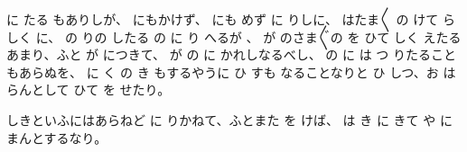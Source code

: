 に
たる
もありしが、
にもかけず、
にも
めず
に
りしに、
はたま〳〵
の
けて
らしく
に、
の
りの
したる
の
に
り
へるが
、
が
のさま〴〵の
を
ひて
しく
えたるあまり、ふと
が
につきて、
が
の
に
かれしなるべし、
の
に
は
つ
りたることもあらぬを、
に
く
の
き
もするやうに
ひ
すも
なることなりと
ひ
しつ、お
は
らんとして
ひて
を
せたり。

しきといふにはあらねど
に
りかねて、ふとまた
を
けば、
は
き
に
きて
や
に
まんとするなり。

